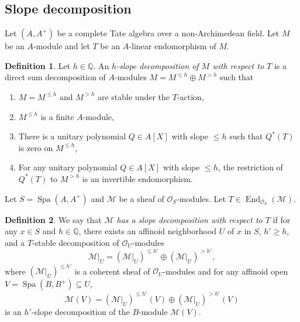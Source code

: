 \documentclass[11pt]{amsart}
\theoremstyle{definition} %
\newtheorem{definition}{Definition}[section]
\theoremstyle{plain} %
\theoremstyle{remark} %
\newcommand{\QQ}{{\mathbb Q}}
\newcommand{\cM}{{\mathcal M}}
\newcommand{\cO}{{\mathcal O}}
\DeclareMathOperator\End{End} %
\DeclareMathOperator\Spa{Spa} %
\begin{document}
\subsection{Slope decomposition}
Let $(A,A^+)$ be a complete Tate algebra over a non-Archimedean field.
Let $M$ be an $A$-module and let $T$ be an $A$-linear endomorphism of $M$.

\begin{definition} \label{def:hslopedecomp}
Let $h\in\QQ$. An \emph{$h$-slope decomposition of $M$ with respect to $T$} is a direct sum decomposition of $A$-modules $M=M^{\leqslant h}\oplus M^{>h}$
such that 
\begin{enumerate}
    \item $M=M^{\leqslant h}$ and $M^{>h}$ are stable under the $T$-action,
    \item $M^{\leqslant h}$ is a finite $A$-module,
    \item There is a unitary polynomial $Q\in A[X]$ with slope $\leqslant h$ such that $Q^\ast(T)$ is zero on $M^{\leqslant h}$,
    \item For any unitary polynomial $Q\in A[X]$ with slope $\leqslant h$, the restriction of $Q^\ast(T)$ to $M^{> h}$ is an invertible endomorphism.
\end{enumerate}
\end{definition}

Let $S=\Spa (A, A^+)$ and $\cM$ be a sheaf of $\cO_S$-modules.
Let $T\in \End_{\cO_S}(\cM)$.
\begin{definition}
We say that \emph{$\cM$ has a slope decomposition with respect to $T$} if for any $x\in S$ and $h\in \QQ$, there exists an affinoid neighborhood $U$ of $x$ in $S$, $h'\geqslant h$, and a $T$-stable decomposition of $\cO_U$-modules
\[
\left.\cM \right|_U = (\left.\cM \right|_U)^{\leqslant h'}\oplus (\left.\cM \right|_U)^{>h'},
\]
where $(\left.\cM \right|_U)^{\leqslant h'}$ is a coherent sheaf of $\cO_U$-modules and for any affinoid open $V = \Spa (B,B^+)\subseteq U$, 
\[
\cM(V) = (\left.\cM \right|_U)^{\leqslant h'}(V)\oplus (\left.\cM \right|_U)^{>h'}(V)
\]
is an $h'$-slope decomposition of the $B$-module $\cM(V)$.
\end{definition}
\end{document}
